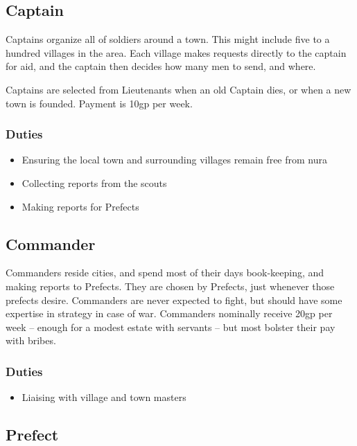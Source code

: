 \begin{multicols}{2}
\subsection{Captain}

Captains organize all of soldiers around a town.
This might include five to a hundred villages in the area.
Each village makes requests directly to the captain for aid, and the captain then decides how many men to send, and where.

Captains are selected from Lieutenants when an old Captain dies, or when a new town is founded.
Payment is 10gp per week.

\subsubsection{Duties}

\begin{itemize}

	\item{Ensuring the local town and surrounding villages remain free from nura}
	\item{Collecting reports from the scouts}
	\item{Making reports for Prefects}

\end{itemize}

\subsection{Commander}

Commanders reside cities, and spend most of their days book-keeping, and making reports to Prefects.
They are chosen by Prefects, just whenever those prefects desire.
Commanders are never expected to fight, but should have some expertise in strategy in case of war.
Commanders nominally receive 20gp per week -- enough for a modest estate with servants -- but most bolster their pay with bribes.

\subsubsection{Duties}

\begin{itemize}

	\item{Liaising with village and town masters}

\end{itemize}

\subsection{Prefect}


\end{multicols}
